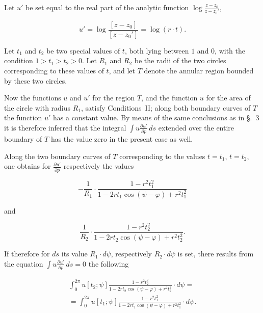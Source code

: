 \documentclass{article}
\begin{document}
Let $u'$ be set equal to the real part of the analytic function $\log \frac{z - z_0}{z - z_0'}$,

\[

u' = \log \frac{[z - z_0]}{[z - z_0']} = \log(r \cdot t).

\]

Let $t_1$ and $t_2$ be two special values of $t$, both lying between $1$ and $0$, with the condition $1 > t_1 > t_2 > 0$. Let $R_1$ and $R_2$ be the radii of the two circles corresponding to these values of $t$, and let $T$ denote the annular region bounded by these two circles.



Now the functions $u$ and $u'$ for the region $T$, and the function $u$ for the area of the circle with radius $R_1$, satisfy Conditions~II; along both boundary curves of $T$ the function $u'$ has a constant value. By means of the same conclusions as in §.~3 it is therefore inferred that the integral $\displaystyle\int u \frac{\partial u'}{\partial p}\,ds$ extended over the entire boundary of $T$ has the value zero in the present case as well.



Along the two boundary curves of $T$ corresponding to the values $t = t_1$, $t = t_2$, one obtains for $\frac{\partial u'}{\partial p}$ respectively the values

\[

-\frac{1}{R_1} \cdot \frac{1 - r^2 t_1^2}{1 - 2r t_1 \cos(\psi - \varphi) + r^2 t_1^2}

\]

and

\[

\frac{1}{R_2} \cdot \frac{1 - r^2 t_2^2}{1 - 2r t_2 \cos(\psi - \varphi) + r^2 t_2^2}.

\]




If therefore for $ds$ its value $R_1 \cdot d\psi$, respectively $R_2 \cdot d\psi$ is set, there results from the equation $\displaystyle\int u \frac{\partial u'}{\partial p}\,ds = 0$ the following

\[

\begin{gathered}

\int_0^{2\pi} u[t_2; \psi] \frac{1 - r^2 t_2^2}{1 - 2r t_2 \cos(\psi - \varphi) + r^2 t_2^2} \cdot d\psi = \\

= \int_0^{2\pi} u[t_1; \psi] \frac{1 - r^2 t_1^2}{1 - 2r t_1 \cos(\psi - \varphi) + r^2 t_1^2} \cdot d\psi.

\end{gathered}

\]
\end{document}

